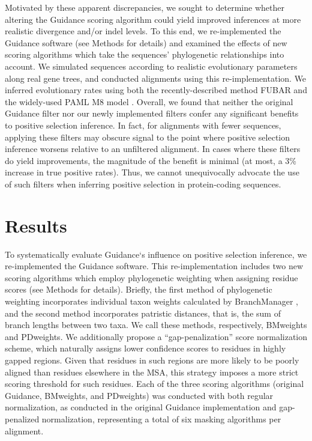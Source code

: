 \documentclass[10pt]{article}
\begin{document}
Motivated by these apparent discrepancies, we sought to determine whether altering the Guidance scoring algorithm could yield improved inferences at more realistic divergence and/or indel levels. To this end, we re-implemented the Guidance software (see Methods for details) and examined the effects of new scoring algorithms which take the sequences' phylogenetic relationships into account. We simulated sequences according to realistic evolutionary parameters along real gene trees, and conducted alignments using this re-implementation. We inferred evolutionary rates using both the recently-described method FUBAR \citep{Murrell2013} and the widely-used PAML M8 model \citep{Yang2007}.
Overall, we found that neither the original Guidance filter nor our newly implemented filters confer any significant benefits to positive selection inference. In fact, for alignments with fewer sequences, applying these filters may obscure signal to the point where positive selection inference worsens relative to an unfiltered alignment. In cases where these filters do yield improvements, the magnitude of the benefit is minimal (at most, a 3\% increase in true positive rates). Thus, we cannot unequivocally advocate the use of such filters when inferring positive selection in protein-coding sequences.


\section*{Results}
To systematically evaluate Guidance`s influence on positive selection inference, we re-implemented the Guidance software. This re-implementation includes two new scoring algorithms which employ phylogenetic weighting when assigning residue scores (see Methods for details). Briefly, the first method of phylogenetic weighting incorporates individual taxon weights calculated by BranchManager \citep{Stone2007}, and the second method incorporates patristic distances, that is, the sum of branch lengths between two taxa. We call these methods, respectively, BMweights and PDweights.  We additionally propose a “gap-penalization” score normalization scheme, which naturally assigns lower confidence scores to residues in highly gapped regions. Given that residues in such regions are more likely to be poorly aligned than residues elsewhere in the MSA, this strategy imposes a more strict scoring threshold for such residues. Each of the three scoring algorithms (original Guidance, BMweights, and PDweights) was conducted with both regular normalization, as conducted in the original Guidance implementation \citep{Penn2010} and gap-penalized normalization, representing a total of six masking algorithms per alignment.
\end{document}
